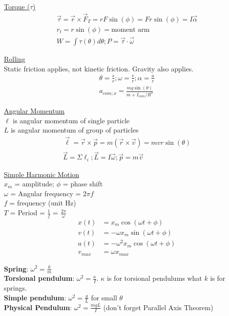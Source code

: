 \documentclass[8pt]{minimal}
\begin{document}
\underline{Torque ($\tau$)}
\begin{gather*}
    \vec{\tau} = \vec{r} \times \vec{F}_T = rF\sin(\phi) = Fr\sin(\phi) = I\vec{\alpha}\\
    r_t = r\sin(\phi) = \text{moment arm}\\
    W = \int \tau(\theta) d\theta; P = \vec{\tau} \cdot \vec{\omega}
\end{gather*}

\underline{Rolling}\\
Static friction applies, not kinetic friction. Gravity also applies. 
\begin{gather*}
    \theta = \frac{s}{r}; \omega = \frac{v}{r}; \alpha = \frac{a}{r}\\
    a_{com;x} = \frac{mg\sin(\theta)}{m + I_{com}/R^2}
\end{gather*}

\underline{Angular Momentum}\\
$\ell$ is angular momentum of single particle\\
$L$ is angular momentum of group of particles
\begin{gather*}
    \vec{\ell} = \vec{r} \times \vec{p} = m(\vec{r} \times \vec{v}) = mvr\sin(\theta)\\
    \vec{L} = \Sigma \ell_i; \vec{L} = I\vec{\omega}; \vec{p} = m\vec{v}
\end{gather*}

\underline{Simple Harmonic Motion}\\
$x_m$ = amplitude; $\phi$ = phase shift\\
$\omega$ = Angular frequency = $2\pi f$\\
$f$ = frequency (unit Hz)\\
$T$ = Period = $\frac{1}{f}$ = $\frac{2\pi}{\omega}$
\begin{align*}
    x(t)    &=  x_m \cos(\omega t + \phi)\\
    v(t)    &=  -\omega x_m \sin(\omega t + \phi)\\
    a(t)    &=  -\omega^2 x_m \cos(\omega t + \phi)\\
    v_{max} &=  \omega x_{max}
\end{align*}

\textbf{Spring}: $\omega^2 = \frac{k}{m}$\\
\textbf{Torsional pendulum}: $\omega^2 = \frac{\kappa}{I}$.
$\kappa$ is for torsional pendulums what $k$ is for springs.\\
\textbf{Simple pendulum}: $\omega^2 = \frac{g}{L}$ for small $\theta$\\
\textbf{Physical Pendulum}: $\omega^2 = \frac{mgL}{I}$ (don't forget Parallel Axis Theorem)
\end{document}
